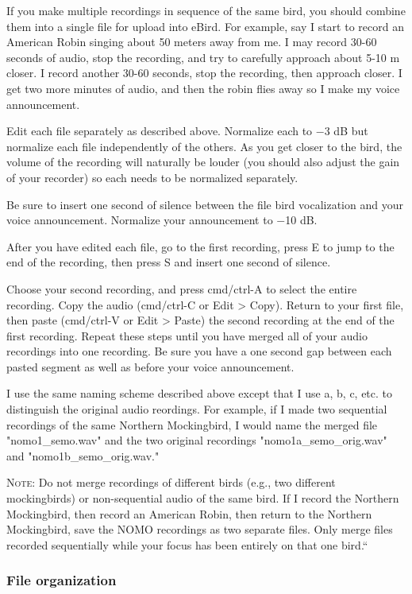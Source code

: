 \documentclass[12pt]{article}
\begin{document}
If you make multiple recordings in sequence of the same bird, you should combine them into a single file for upload into eBird. For example, say I start to record an American Robin singing about 50 meters away from me. I may record 30-60 seconds of audio, stop the recording, and try to carefully approach about 5-10 m closer. I record another 30-60 seconds, stop the recording, then approach closer. I get two more minutes of audio, and then the robin flies away so I make my voice announcement.

Edit each file separately as described above. Normalize each to $-$3 dB but normalize each file independently of the others. As you get closer to the bird, the volume of the recording will naturally be louder (you should also adjust the gain of your recorder) so each needs to be normalized separately.

Be sure to insert one second of silence between the file bird vocalization and your voice announcement. Normalize your announcement to $-$10 dB.

After you have edited each file, go to the first recording, press E to jump to the end of the recording, then press S and insert one second of silence. 

Choose your second recording, and press cmd/ctrl-A to select the entire recording. Copy the audio (cmd/ctrl-C or Edit > Copy). Return to your first file, then paste (cmd/ctrl-V or Edit > Paste) the second recording at the end of the first recording. Repeat these steps until you have merged all of your audio recordings into one recording. Be sure you have a one second gap between each pasted segment as well as before your voice announcement.

I use the same naming scheme described above except that I use a, b, c, etc. to distinguish the original audio reordings. For example, if I made two sequential recordings of the same Northern Mockingbird, I would name the merged file "nomo1\_semo.wav" and the two original recordings "nomo1a\_semo\_orig.wav" and "nomo1b\_semo\_orig.wav."

\textsc{Note:} Do not merge recordings of different birds (e.g., two different mockingbirds) or non-sequential audio of the same bird. If I record the Northern Mockingbird, then record an American Robin, then return to the Northern Mockingbird, save the NOMO recordings as two separate files. Only merge files recorded sequentially while your focus has been entirely on that one bird.``


\subsubsection*{File organization}
\end{document}
